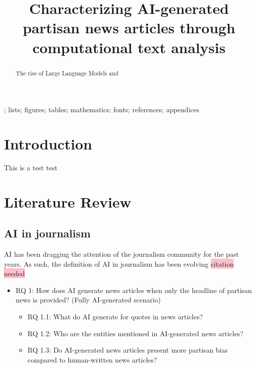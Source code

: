 \documentclass[]{interact}
\theoremstyle{plain}%
\theoremstyle{definition}
\theoremstyle{remark}
\begin{document}

\title{Characterizing AI-generated partisan news articles through computational text analysis}

\author{
}

\maketitle

\begin{abstract}
The rise of Large Language Models and 
\end{abstract}

\begin{keywords}
; lists; figures; tables; mathematics; fonts; references; appendices
\end{keywords}


\section{Introduction}
This is a test \citet{baly2020we} test

\section{Literature Review}


\subsection{AI in journalism}

AI has been dragging the attention of the journalism community for the past years. As such, the definition of AI in journalism has been evolving \colorbox{pink}{citation needed}

\begin{itemize}
  \item RQ 1: How does AI generate news articles when only the headline of partisan news is provided? (Fully AI-generated scenario)
  \begin{itemize}
    \item RQ 1.1: What do AI generate for quotes in news articles?
    \item RQ 1.2: Who are the entities mentioned in AI-generated news articles?
    \item RQ 1.3: Do AI-generated news articles present more partisan bias compared to human-written news articles?
  \end{itemize}
\end{itemize}
\end{document}

